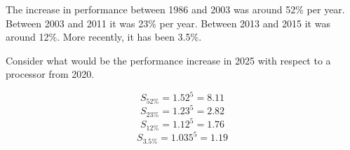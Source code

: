\begin{acexercise}\end{acexercise}

The increase in performance between 1986 and 2003 was around 52\% per year.
Between 2003 and 2011 it was 23\% per year. Between 2013 and 2015 it was
around 12\%. More recently, it has been 3.5\%.

Consider what would be the performance increase in 2025 with respect to
a processor from 2020.

\begin{acsolution}\end{acsolution}

\[S_{52\%} = 1.52^5 = 8.11\]
\[S_{23\%} = 1.23^5 = 2.82\]
\[S_{12\%} = 1.12^5 = 1.76\]
\[S_{3.5\%} = 1.035^5 = 1.19\]

